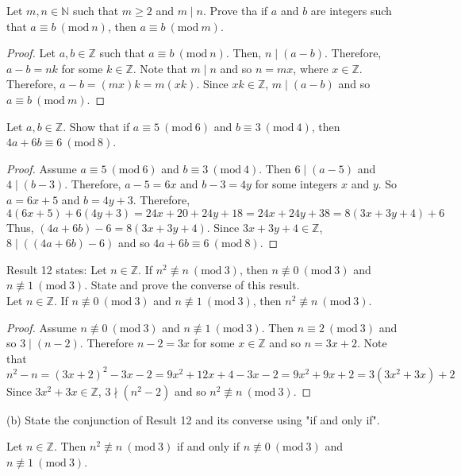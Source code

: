 \documentclass[12pt]{article}
\newcommand{\N}{\mathbb{N}}
\newcommand{\Z}{\mathbb{Z}}
\newcommand{\Mod}[1]{\ (\mathrm{mod}\ #1)}
\newenvironment{problem}[2][Problem]{\begin{trivlist}
		\item[\hskip \labelsep {\bfseries #1}\hskip \labelsep {\bfseries #2.}]}{\end{trivlist}}
\newenvironment{solution}[2][Solution]{\begin{trivlist}
		\item[\hskip \labelsep {\bfseries #1}\hskip \labelsep {\bfseries #2.}]}{\end{trivlist}}
\begin{document}
	\begin{problem}{18}
		Let $m,n\in \N$ such that  $m\geq 2$ and $m\mid n$. Prove tha if $a$ and $b$ are integers such that $a \equiv b \Mod n$, then $a \equiv b \Mod m$.
		\begin{proof}
			Let $a,b \in \Z$ such that $a \equiv b \Mod n$. Then, $n\mid (a-b)$. Therefore, $a-b=nk$ for some $k\in \Z$. Note that $m\mid n$ and so $n = mx$, where $x\in \Z$. Therefore, $a-b = (mx)k = m(xk)$. Since $xk\in \Z$, $m\mid (a-b)$ and so $a \equiv b \Mod m$.
		\end{proof}
	\end{problem}
 
	\begin{problem}{19}
		Let $a,b\in \Z$. Show that if $a\equiv 5 \Mod 6$ and $b\equiv 3 \Mod 4$, then $4a+6b \equiv 6 \Mod 8$.
		\begin{proof}
			Assume $a\equiv 5 \Mod 6$ and $b\equiv 3 \Mod 4$. Then $6\mid (a-5)$ and $4 \mid (b-3)$. Therefore, $a-5 = 6x$ and $b-3 = 4y$ for some integers $x$ and $y$. So $a = 6x+5$ and $b=4y+3$. Therefore,
			\begin{equation*}
				4(6x+5) + 6(4y+3) = 24x+20+24y+18 = 24x+24y+38 = 8(3x+3y+4)+6
			\end{equation*}
		Thus, $(4a + 6b)-6 = 8(3x+3y+4)$. Since $3x+3y+4\in \Z$, $8\mid((4a+6b)-6) $ and so $4a+6b \equiv 6 \Mod 8$.
		\end{proof}
	\end{problem}

	\begin{problem}{20}
		 Result 12 states: Let $n \in \Z$. If $n^{2}\not\equiv n \Mod 3$, then $n\not\equiv 0 \Mod 3$ and $n \not\equiv 1 \Mod 3$. State and prove the converse of this result.\\
		 
		 Let $n \in \Z$. If $n\not\equiv 0 \Mod 3$ and $n \not\equiv 1 \Mod 3$, then $n^{2}\not\equiv n \Mod 3$. 
		 \begin{proof}
		 	Assume $n\not\equiv 0 \Mod 3$ and $n \not\equiv 1 \Mod 3$. Then $n \equiv 2 \Mod 3$ and so $3\mid (n-2)$. Therefore $n-2=3x$ for some $x\in \Z$ and so $n=3x+2$. Note that
		 	\begin{equation*}
		 		n^{2}-n = (3x+2)^{2}-3x-2 = 9x^{2}+12x+4-3x-2 = 9x^{2}+9x+2 = 3(3x^{2}+3x)+2
		 	\end{equation*}
	 		Since $3x^{2}+3x \in \Z$, $3\nmid (n^{2}-2)$ and so $n^{2} \not\equiv n \Mod 3$.
		 \end{proof}
	 
	 	(b) State the conjunction of Result 12 and its converse using "if and only if".
	 \begin{solution}{b}
	 	Let $n\in \Z$. Then $n^{2} \not\equiv n \Mod 3$ if and only if $n \not\equiv 0 \Mod 3$ and $n \not\equiv 1 \Mod 3$.
	 \end{solution}
	\end{problem}
\end{document}
